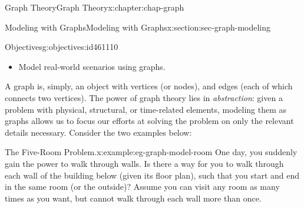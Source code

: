 \documentclass[oneside,10pt,]{book}
\numberwithin{equation}{section}
\begin{document}
%
%
\typeout{************************************************}
\typeout{************************************************}
%
\begin{chapterptx}{Graph Theory}{}{Graph Theory}{}{}{x:chapter:chap-graph}
%
%
\typeout{************************************************}
\typeout{************************************************}
%
\begin{sectionptx}{Modeling with Graphs}{}{Modeling with Graphs}{}{}{x:section:sec-graph-modeling}
\begin{objectives}{Objectives}{g:objectives:id461110}
%
\begin{itemize}[label=\textbullet]
\item{}Model real-world scenarios using graphs.%
\end{itemize}
\end{objectives}
A graph is, simply, an object with vertices (or nodes), and edges (each of which connects two vertices). The power of graph theory lies in \emph{abstraction}: given a problem with physical, structural, or time-related elements, modeling them as graphs allows us to focus our efforts at solving the problem on only the relevant details necessary. Consider the two examples below:%
\begin{example}{The Five-Room Problem.}{x:example:eg-graph-model-room}%
One day, you suddenly gain the power to walk through walls. Is there a way for you to walk through each wall of the building below (given its floor plan), such that you start and end in the same room (or the outside)? Assume you can visit any room as many times as you want, but cannot walk through each wall more than once.%
\begin{sidebyside}{1}{0.3}{0.3}{0}%
\begin{sbspanel}{0.4}%
\end{sbspanel}
\end{sidebyside}
\end{example}
\end{sectionptx}
\end{chapterptx}
\end{document}
